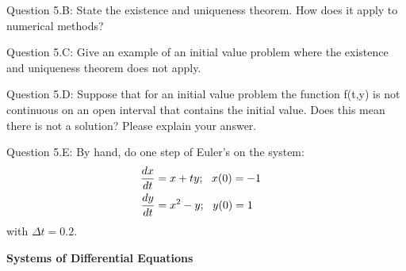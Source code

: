 \documentclass{article}
\def\ds{\displaystyle}
\begin{document}
\medskip \par \noindent
Question 5.B:  State the existence and uniqueness theorem. How does it apply to numerical methods?
\medskip \par \noindent
Question 5.C: Give an example of an initial value problem where the existence and uniqueness theorem does not apply. 
\medskip \par \noindent
Question 5.D: Suppose that for an initial value problem the function f(t,y) is not continuous on an open interval that contains the initial value. Does this mean there is not a solution? Please explain your answer. 
\medskip \par \noindent
Question 5.E: By hand, do one step of Euler's on the system:
\begin{align*}
    \frac {dx}{dt} &= x + ty; \ \ x(0)=-1 \cr 
    \frac {dy}{dt} &= x^2 - y; \ \ y(0)= 1
\end{align*}
with $\ds \Delta t = 0.2$.
\par \bigskip \par \noindent
{\bf Systems of Differential Equations} \par \medskip \noindent
\end{document}
